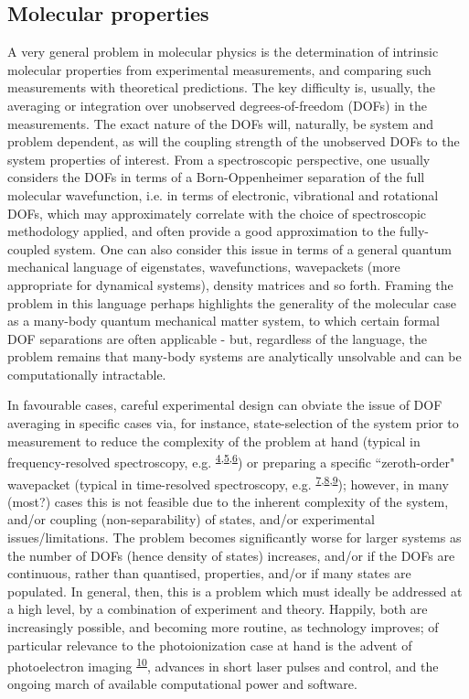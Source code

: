 \documentclass[10pt]{article}
\begin{document}
\subsection{Molecular properties}
A very general problem in molecular physics is the determination of intrinsic molecular properties from experimental measurements, and comparing such measurements with theoretical predictions. The key difficulty is, usually, the averaging or integration over unobserved degrees-of-freedom (DOFs) in the measurements. The exact nature of the DOFs will, naturally, be system and problem dependent, as will the coupling strength of the unobserved DOFs to the system properties of interest. From a spectroscopic perspective, one usually considers the DOFs in terms of a Born-Oppenheimer separation of the full molecular wavefunction, i.e. in terms of electronic, vibrational and rotational DOFs, which may approximately correlate with the choice of spectroscopic methodology applied, and often provide a good approximation to the fully-coupled system. One can also consider this issue in terms of a general quantum mechanical language of eigenstates, wavefunctions, wavepackets (more appropriate for dynamical systems), density matrices and so forth. Framing the problem in this language perhaps highlights the generality of the molecular case as a many-body quantum mechanical matter system, to which certain formal DOF separations are often applicable - but, regardless of the language, the problem remains that many-body systems are analytically unsolvable and can be computationally intractable. %

In favourable cases, careful experimental design can obviate the issue of DOF averaging in specific cases via, for instance, state-selection of the system prior to measurement to reduce the complexity of the problem at hand (typical in frequency-resolved spectroscopy, e.g. \textsuperscript{\hyperref[csl:4]{4},\hyperref[csl:5]{5},\hyperref[csl:6]{6}}) or preparing a specific ``zeroth-order" wavepacket (typical in time-resolved spectroscopy, e.g. \textsuperscript{\hyperref[csl:7]{7},\hyperref[csl:8]{8},\hyperref[csl:9]{9}}); however, in many (most?) cases this is not feasible due to the inherent complexity of the system, and/or coupling (non-separability) of states, and/or experimental issues/limitations. The problem becomes significantly worse for larger systems as the number of DOFs (hence density of states) increases, and/or if the DOFs are continuous, rather than quantised, properties, and/or if many states are populated. In general, then, this is a problem which must ideally be addressed at a high level, by a combination of experiment and theory. Happily, both are increasingly possible, and becoming more routine, as technology improves; of particular relevance to the photoionization case at hand is the advent of photoelectron imaging \textsuperscript{\hyperref[csl:10]{10}}, advances in short laser pulses and control, and the ongoing march of available computational power and software.
\end{document}
